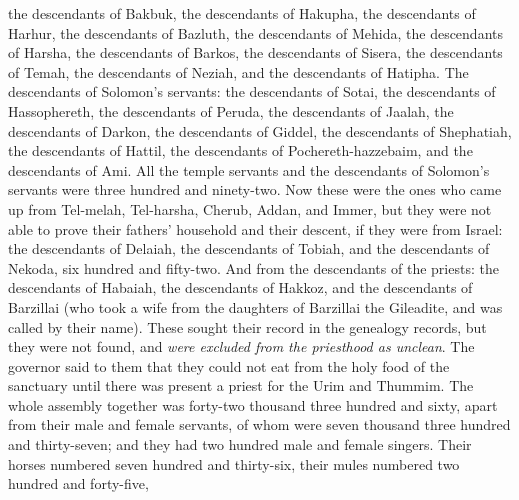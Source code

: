 \begin{biblechapter}
\verse the descendants of Bakbuk, the descendants of Hakupha, the descendants of Harhur,
\verse the descendants of Bazluth, the descendants of Mehida, the descendants of Harsha,
\verse the descendants of Barkos, the descendants of Sisera, the descendants of Temah,
\verse the descendants of Neziah, and the descendants of Hatipha.
\verse The descendants of Solomon’s servants: the descendants of Sotai, the descendants of Hassophereth, the descendants of Peruda,
\verse the descendants of Jaalah, the descendants of Darkon, the descendants of Giddel,
\verse the descendants of Shephatiah, the descendants of Hattil, the descendants of Pochereth-hazzebaim, and the descendants of Ami.
\verse All the temple servants and the descendants of Solomon’s servants were three hundred and ninety-two.
\verse Now these were the ones who came up from Tel-melah, Tel-harsha, Cherub, Addan, and Immer, but they were not able to prove their fathers’ household and their descent, if they were from Israel:
\verse the descendants of Delaiah, the descendants of Tobiah, and the descendants of Nekoda, six hundred and fifty-two.
\verse And from the descendants of the priests: the descendants of Habaiah, the descendants of Hakkoz, and the descendants of Barzillai (who took a wife from the daughters of Barzillai the Gileadite, and was called by their name).
\verse These sought their record in the genealogy records, but they were not found, and \textit{were excluded from the priesthood as unclean}.
\verse The governor said to them that they could not eat from the holy food of the sanctuary until there was present a priest for the Urim and Thummim.
\verse The whole assembly together was forty-two thousand three hundred and sixty,
\verse apart from their male and female servants, of whom were seven thousand three hundred and thirty-seven; and they had two hundred male and female singers.
\verse Their horses numbered seven hundred and thirty-six, their mules numbered two hundred and forty-five,

\end{biblechapter}
